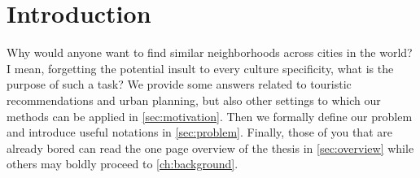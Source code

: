 \chapter{Introduction}
\label{ch:introduction}

Why would anyone want to find similar neighborhoods across cities in the world?
I mean, forgetting the potential insult to every culture specificity, what is
the purpose of such a task? We provide some answers related to touristic
recommendations and urban planning, but also other settings to which our
methods can be applied in \autoref{sec:motivation}. Then we formally define our
problem and introduce useful notations in \autoref{sec:problem}. Finally, those
of you that are already bored can read the one page overview of the thesis in
\autoref{sec:overview} while others may boldly proceed to
\autoref{ch:background}.




